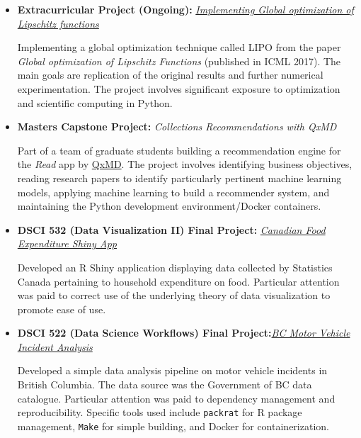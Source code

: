 \documentclass[11pt,a4paper,sans]{moderncv}        %
\newcommand\Colorhref[3][cyan]{\href{#2}{\small\color{#1}#3}}
\begin{document}
\begin{itemize}

\item{\textbf{Extracurricular Project (Ongoing):} \textit{\Colorhref{https://github.com/UBC-CS/lipo-python}{Implementing Global optimization of Lipschitz functions}}

\vspace{3pt}

\small{Implementing a global optimization technique 
called LIPO from the paper \textit{Global optimization of Lipschitz Functions} (published in ICML 2017). The main goals are replication of the original results and further 
numerical experimentation. The project involves significant exposure to optimization and scientific computing in Python.}}

\vspace{6pt}

\item{\textbf{Masters Capstone Project:} \textit{Collections Recommendations with QxMD}

\vspace{3pt}

\small{Part of a team of graduate students building a recommendation engine 
for the \textit{Read} app by \Colorhref{https://qxmd.com/}{QxMD}. The project involves identifying business objectives, reading research papers to identify particularly pertinent machine learning models, applying machine learning to build a recommender system, and maintaining the Python development environment/Docker containers.}}

\vspace{6pt}

\item{\textbf{DSCI 532 (Data Visualization II) Final Project:} \textit{\Colorhref{https://github.com/bradleypick/food-expenditure}{Canadian Food Expenditure Shiny App}}

\vspace{3pt}

\small{Developed an R Shiny application displaying data 
collected by Statistics Canada pertaining to household expenditure on food. Particular 
attention was paid to correct use of the underlying theory of data visualization to promote ease of use.}}

\vspace{6pt}

\item{\textbf{DSCI 522 (Data Science Workflows) Final Project:}\textit{\Colorhref{https://github.com/bradleypick/BC-motor-vehicle-incidents}{BC Motor Vehicle Incident Analysis}}

\vspace{3pt}

\small{Developed a simple data analysis pipeline on motor 
vehicle incidents in British Columbia. The data source was the Government of BC data catalogue.
Particular attention was paid to dependency management and reproducibility. 
Specific tools used include \texttt{packrat} for R package management, \texttt{Make} for simple building, and 
Docker for containerization.}}

\end{itemize}
\end{document}
